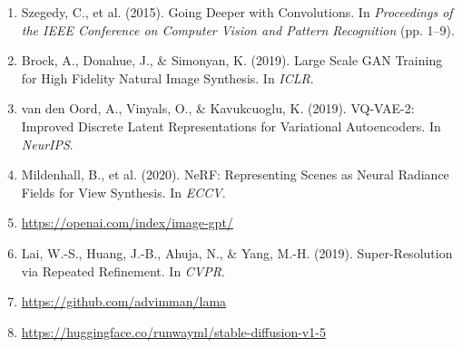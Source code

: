 \documentclass[12pt]{report}
\begin{document}
\begin{enumerate}
    \item Szegedy, C., et al. (2015). Going Deeper with Convolutions. In \textit{Proceedings of the IEEE Conference on Computer Vision and Pattern Recognition} (pp. 1–9).
    
    \item Brock, A., Donahue, J., \& Simonyan, K. (2019). Large Scale GAN Training for High Fidelity Natural Image Synthesis. In \textit{ICLR}.
    
    \item van den Oord, A., Vinyals, O., \& Kavukcuoglu, K. (2019). VQ-VAE-2: Improved Discrete Latent Representations for Variational Autoencoders. In \textit{NeurIPS}.
    
    \item Mildenhall, B., et al. (2020). NeRF: Representing Scenes as Neural Radiance Fields for View Synthesis. In \textit{ECCV}.
    
    \item \url{https://openai.com/index/image-gpt/}
    
    \item Lai, W.-S., Huang, J.-B., Ahuja, N., \& Yang, M.-H. (2019). Super-Resolution via Repeated Refinement. In \textit{CVPR}.
    
    \item \url{https://github.com/advimman/lama}
    
    \item \url{https://huggingface.co/runwayml/stable-diffusion-v1-5}
\end{enumerate}
\end{document}
